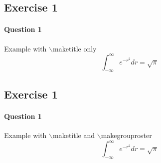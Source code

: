 \documentclass[a4paper]{scrartcl} %
\begin{document}
    \maketitle
    \subsection*{Exercise 1}
    \paragraph*{Question 1}
        Example with $\backslash${}maketitle only
    \[
        \int_{-\infty}^{\infty} e^{-r^2}dr = \sqrt\pi
    \]

    \newpage
    \maketitle
    \makegrouproster
    \subsection*{Exercise 1}
    \paragraph*{Question 1}
        Example with $\backslash${}maketitle and $\backslash${}makegrouproster
    \[
        \int_{-\infty}^{\infty} e^{-r^2}dr = \sqrt\pi
    \]
\end{document}
